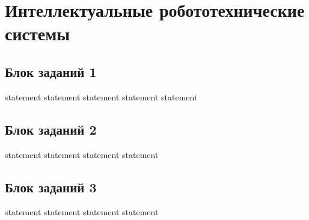 \chapter{Интеллектуальные робототехнические системы}

\section{Блок заданий 1}

{statement}
{statement}
{statement}
{statement}
{statement}

\section{Блок заданий 2}

{statement}
{statement}
{statement}
{statement}

\section{Блок заданий 3}

{statement}
{statement}
{statement}
{statement}